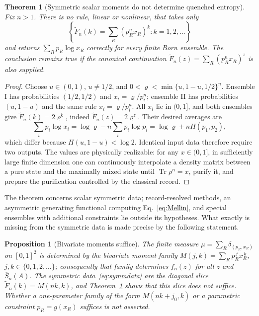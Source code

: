 \documentclass[aps,prx,reprint,superscriptaddress,nobibnotes,longbibliography]{revtex4-2}
\newtheorem{theorem}{Theorem}
\newtheorem{proposition}{Proposition}
\theoremstyle{remark}
\newcommand{\Tr}{\operatorname{Tr}}
\begin{document}
\begin{theorem}[Symmetric scalar moments do not determine quenched entropy]
\label{thm:no-go}
Fix $n>1$.  There is no rule, linear or nonlinear, that takes only
\begin{equation}
 \left\{\widetilde F_n(k)=\sum_R(p_R^nx_R)^k:k=1,2,\ldots\right\}
 \label{eq:symmdata}
\end{equation}
and returns $\sum_Rp_R\log x_R$ correctly for every finite Born ensemble.  The conclusion remains true if the canonical continuation
$\widetilde F_n(z)=\sum_R(p_R^nx_R)^z$ is also supplied.
\end{theorem}

\begin{proof}
Choose $u\in(0,1)$, $u\ne1/2$, and
$0<\varrho<\min\{u,1-u,1/2\}^n$.  Ensemble I has probabilities $(1/2,1/2)$ and $x_i=\varrho/p_i^n$; ensemble II has probabilities $(u,1-u)$ and the same rule $x_i=\varrho/p_i^n$.  All $x_i$ lie in $(0,1]$, and both ensembles give
$\widetilde F_n(k)=2\varrho^k$, indeed $\widetilde F_n(z)=2\varrho^z$.  Their desired averages are
\begin{equation}
 \sum_i p_i\log x_i=\log\varrho-n\sum_i p_i\log p_i
 =\log\varrho+nH(p_1,p_2),
\end{equation}
which differ because $H(u,1-u)<\log2$.  Identical input data therefore require two outputs.  The values are physically realizable: for any $x\in(0,1]$, in sufficiently large finite dimension one can continuously interpolate a density matrix between a pure state and the maximally mixed state until $\Tr\rho^n=x$, purify it, and prepare the purification controlled by the classical record.
\end{proof}

The theorem concerns scalar symmetric data; record-resolved methods, an asymmetric generating functional computing Eq.~\eqref{eq:Mellin}, and special ensembles with additional constraints lie outside its hypotheses.  What exactly is missing from the symmetric data is made precise by the following statement.

\begin{proposition}[Bivariate moments suffice]
\label{prop:bivariate}
The finite measure $\mu=\sum_R\delta_{(p_R,x_R)}$ on $[0,1]^2$ is determined by the bivariate moment family $M(j,k)=\sum_Rp_R^{\,j}x_R^{\,k}$, $j,k\in\{0,1,2,\ldots\}$; consequently that family determines $f_n(z)$ for all $z$ and $\overline S_n(A)$.  The symmetric data~\eqref{eq:symmdata} are the diagonal slice $\widetilde F_n(k)=M(nk,k)$, and Theorem~\ref{thm:no-go} shows that this slice does not suffice.  Whether a one-parameter family of the form $M(nk+j_0,k)$ or a parametric constraint $p_R=g(x_R)$ suffices is not asserted.
\end{proposition}
\end{document}
